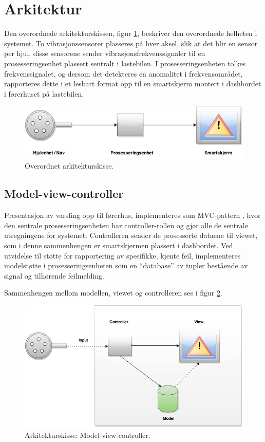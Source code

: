 \section{Arkitektur}
Den overordnede arkitekturskissen, figur \ref{fig:overordnet-ark}, 
beskriver den overordnede helheten i systemet. To vibrasjonssensorer plasseres
på hver aksel, slik at det blir en sensor per hjul. disse sensorene sender 
vibrasjonsfrekvenssignaler til en prosesseringsenhet plassert sentralt i lastebilen. 
I prosesseringsenheten tolkes frekvenssignalet, og dersom det detekteres en 
anomalitet i frekvensområdet, rapporteres dette i et lesbart format opp til en 
smartskjerm montert i dashbordet i førerhuset på lastebilen.
\newline
\begin{figure}[H]
	\centering
	\includegraphics[width=1.00\textwidth]{images/arkitektur-overordnet.png}
	\caption{Overordnet arkitekturskisse.}
	\label{fig:overordnet-ark}
\end{figure}

\subsection{Model-view-controller}
\label{sec:arkitektur}
Presentasjon av varsling opp til førerhus, implementeres som MVC-pattern \cite{MVC}, 
hvor den sentrale prosesseringsenheten har controller-rollen og gjør alle 
de sentrale utregningene for systemet. Controlleren sender de prosesserte 
dataene til viewet, som i denne sammenhengen er smartskjermen plassert i 
dashbordet. Ved utvidelse til støtte for rapportering av spesifikke, 
kjente feil, implementeres modelstøtte i prosesseringsenheten som en 
``database'' av tupler bestående av signal og tilhørende feilmelding. 

Sammenhengen mellom modellen, viewet og controlleren ses i figur \ref{fig:mvc}.
\newline
\begin{figure}[H]
	\centering
	\includegraphics[width=1.00\textwidth]{images/architecture2-mvc.png}
	\caption{Arkitekturskisse: Model-view-controller.}
	\label{fig:mvc}
\end{figure}